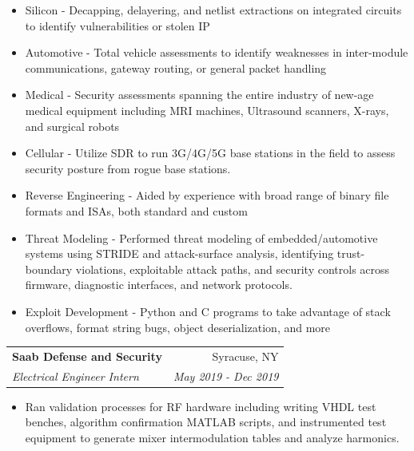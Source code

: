 \documentclass[letterpaper,11pt]{article}
\makeatletter
\newcommand{\resumeItem}[1]{
  \item\small{
    #1 \vspace{-4pt}
  }
}
\newcommand{\resumeSubheading}[4]{
  \vspace{2pt}
    \begin{tabular*}{0.97\textwidth}[t]{l@{\extracolsep{\fill}}r}
	\textbf{#1} & #2 \\
	\textit{\small#3}  & \textit{\small#4} \\
    \end{tabular*} \vspace{-5pt}
}
\newcommand{\resumeSubHeadingListStart}{\begin{itemize}[leftmargin=*]}
\newcommand{\resumeSubHeadingListEnd}{\end{itemize}}
\makeatother
\begin{document}
    \resumeSubHeadingListStart
      \resumeItem{Silicon - Decapping, delayering, and netlist extractions on integrated circuits to identify vulnerabilities or stolen IP}
      \resumeItem{Automotive - Total vehicle assessments to identify weaknesses in inter-module communications, gateway routing, or general packet handling}
      \resumeItem{Medical - Security assessments spanning the entire industry of new-age medical equipment including MRI machines, Ultrasound scanners, X-rays, and surgical robots}
      \resumeItem{Cellular - Utilize SDR to run 3G/4G/5G base stations in the field to assess security posture from rogue base stations. }
      \resumeItem{Reverse Engineering - Aided by experience with broad range of binary file formats and ISAs, both standard and custom}
      \resumeItem{Threat Modeling - Performed threat modeling of embedded/automotive systems using STRIDE and attack-surface analysis, identifying trust-boundary violations, exploitable attack paths, and security controls across firmware, diagnostic interfaces, and network protocols.
}
      \resumeItem{Exploit Development - Python and C programs to take advantage of stack overflows, format string bugs, object deserialization, and more}
    \resumeSubHeadingListEnd

    \resumeSubheading
      {Saab Defense and Security}{Syracuse, NY}
      {Electrical Engineer Intern}{May 2019 - Dec 2019}

    \resumeSubHeadingListStart
      \resumeItem{Ran validation processes for RF hardware including writing VHDL test benches, algorithm confirmation MATLAB scripts, and instrumented test equipment to generate mixer intermodulation tables and analyze harmonics.}
    \resumeSubHeadingListEnd


\end{document}
